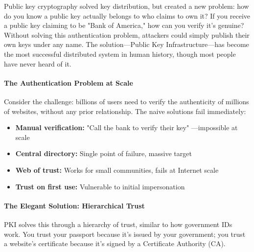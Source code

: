\documentclass[11pt,a4paper]{article}
\begin{document}
Public key cryptography solved key distribution, but created a new problem: how do you know a public key actually belongs to who claims to own it? If you receive a public key claiming to be "Bank of America," how can you verify it's genuine? Without solving this authentication problem, attackers could simply publish their own keys under any name. The solution---Public Key Infrastructure---has become the most successful distributed system in human history, though most people have never heard of it.

\paragraph{The Authentication Problem at Scale}

Consider the challenge: billions of users need to verify the authenticity of millions of websites, without any prior relationship. The naive solutions fail immediately:

\begin{itemize}
    \item \textbf{Manual verification:} "Call the bank to verify their key" ---impossible at scale
    \item \textbf{Central directory:} Single point of failure, massive target
    \item \textbf{Web of trust:} Works for small communities, fails at Internet scale
    \item \textbf{Trust on first use:} Vulnerable to initial impersonation
\end{itemize}

\paragraph{The Elegant Solution: Hierarchical Trust}

PKI solves this through a hierarchy of trust, similar to how government IDs work. You trust your passport because it's issued by your government; you trust a website's certificate because it's signed by a Certificate Authority (CA).
\end{document}
